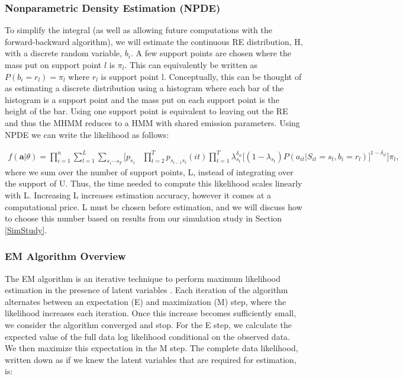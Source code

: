 \documentclass[num-refs]{wiley-article}
\begin{document}
\subsubsection{Nonparametric Density Estimation (NPDE)}

To simplify the integral (as well as allowing future computations with the forward-backward algorithm), we will estimate the continuous RE distribution, H, with a discrete random variable, $b_i$. A few support points are chosen where the mass put on support point $l$ is $\pi_l$. This can equivalently be written as $P(b_i = r_l) = \pi_l$ where $r_l$ is support point l. Conceptually, this can be thought of as estimating a discrete distribution using a histogram where each bar of the histogram is a support point and the mass put on each support point is the height of the bar. Using one support point is equivalent to leaving out the RE and thus the MHMM reduces to a HMM with shared emission parameters. Using NPDE we can write the likelihood as follows: 

\begin{equation*}\label{like2}
    \begin{split}
f(\textbf{a}|\theta) = \prod_{i=1}^n \sum_{l=1}^L \sum_{{s_1}\cdots{s_T}} \biggr[ 
    p_{s_1} & \prod_{t=2}^T p_{s_{t-1}s_t}(it) 
    \prod_{t=1}^T \lambda_{s_t}^{\delta_{it}} \big[(1-\lambda_{s_t})P(a_{it}|S_{it}=s_t,b_i=r_l)\big]^{1-\delta_{it}} \biggr] \pi_l,
    \end{split}
\end{equation*}
where we sum over the number of support points, L, instead of integrating over the support of U. Thus, the time needed to compute this likelihood scales linearly with L. Increasing L increases estimation accuracy, however it comes at a computational price. L must be chosen before estimation, and we will discuss how to choose this number based on results from our simulation study in Section \ref{SimStudy}.

\subsubsection{EM Algorithm Overview}

The EM algorithm is an iterative technique to perform maximum likelihood estimation in the presence of latent variables \cite{dempster1977}. Each iteration of the algorithm alternates between an expectation (E) and maximization (M) step, where the likelihood increases each iteration. Once this increase becomes sufficiently small, we consider the algorithm converged and stop. For the E step, we calculate the expected value of the full data log likelihood conditional on the observed data. We then maximize this expectation in the M step. The complete data likelihood, written down as if we knew the latent variables that are required for estimation, is: 
\end{document}
